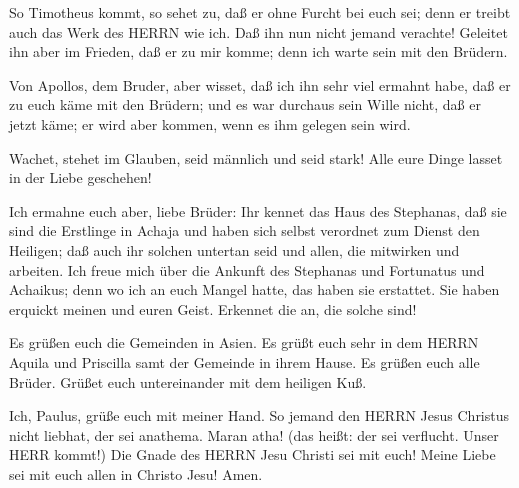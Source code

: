  So Timotheus kommt, so sehet zu, daß er ohne Furcht bei
euch sei; denn er treibt auch das Werk des HERRN wie ich. 
Daß ihn nun nicht jemand verachte! Geleitet ihn aber im Frieden, daß er
zu mir komme; denn ich warte sein mit den Brüdern.

 Von Apollos, dem Bruder, aber wisset, daß ich ihn sehr
viel ermahnt habe, daß er zu euch käme mit den Brüdern; und es war
durchaus sein Wille nicht, daß er jetzt käme; er wird aber kommen, wenn
es ihm gelegen sein wird.

 Wachet, stehet im Glauben, seid männlich und seid stark!
 Alle eure Dinge lasset in der Liebe geschehen!

 Ich ermahne euch aber, liebe Brüder: Ihr kennet das Haus
des Stephanas, daß sie sind die Erstlinge in Achaja und haben sich
selbst verordnet zum Dienst den Heiligen;  daß auch ihr
solchen untertan seid und allen, die mitwirken und arbeiten.
 Ich freue mich über die Ankunft des Stephanas und
Fortunatus und Achaikus; denn wo ich an euch Mangel hatte, das haben sie
erstattet.  Sie haben erquickt meinen und euren Geist.
Erkennet die an, die solche sind!

 Es grüßen euch die Gemeinden in Asien. Es grüßt euch sehr
in dem HERRN Aquila und Priscilla samt der Gemeinde in ihrem Hause.
 Es grüßen euch alle Brüder. Grüßet euch untereinander mit
dem heiligen Kuß.

 Ich, Paulus, grüße euch mit meiner Hand.  So
jemand den HERRN Jesus Christus nicht liebhat, der sei anathema. Maran
atha! (das heißt: der sei verflucht. Unser HERR kommt!) 
Die Gnade des HERRN Jesu Christi sei mit euch!  Meine Liebe
sei mit euch allen in Christo Jesu! Amen.

